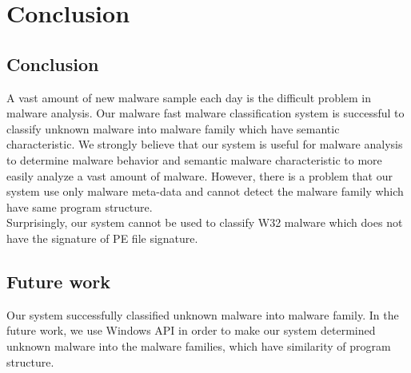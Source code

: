 

\chapter{Conclusion}\label{chap:7}
\section{Conclusion}
A vast amount of new malware sample each day is the difficult problem in malware analysis. Our malware fast malware classification system is successful to classify unknown malware into malware family which have semantic characteristic. We strongly believe that our system is useful for malware analysis to determine malware behavior and semantic malware characteristic to more easily analyze a vast amount of malware.
However, there is a problem that our system use only malware meta-data and cannot detect the malware family which have same program structure.\\
Surprisingly, our system cannot be used to classify W32 malware which does not have the signature of PE file signature. 
 
\section{Future work}
Our system successfully classified unknown malware into malware family. In the future work, we use Windows API in order to make our system determined unknown malware into the malware families, which have similarity of program structure. 
